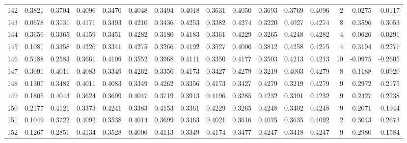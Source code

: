 \begin{tabular}{lrrrrrrrrrrrrrrr}
142 &      0.3821 &  0.3704 &  0.4096 &  0.3470 &  0.4048 &  0.3494 &  0.4018 &  0.3631 &  0.4050 &  0.3693 &   0.3769 &     0.4096 &      2 &                    0.0275 &                    -0.0117 \\
143 &      0.0678 &  0.3731 &  0.4171 &  0.3493 &  0.4210 &  0.3436 &  0.4253 &  0.3382 &  0.4274 &  0.3220 &   0.4027 &     0.4274 &      8 &                    0.3596 &                     0.3053 \\
144 &      0.3656 &  0.3365 &  0.4159 &  0.3451 &  0.4282 &  0.3180 &  0.4183 &  0.3361 &  0.4229 &  0.3265 &   0.4248 &     0.4282 &      4 &                    0.0626 &                    -0.0291 \\
145 &      0.1081 &  0.3358 &  0.4226 &  0.3341 &  0.4275 &  0.3266 &  0.4192 &  0.3527 &  0.4006 &  0.3812 &   0.4258 &     0.4275 &      4 &                    0.3194 &                     0.2277 \\
146 &      0.5188 &  0.2583 &  0.3661 &  0.4109 &  0.3552 &  0.3968 &  0.4111 &  0.3350 &  0.4177 &  0.3503 &   0.4213 &     0.4213 &     10 &                   -0.0975 &                    -0.2605 \\
147 &      0.3091 &  0.4011 &  0.4083 &  0.3349 &  0.4262 &  0.3356 &  0.4173 &  0.3427 &  0.4279 &  0.3219 &   0.4003 &     0.4279 &      8 &                    0.1188 &                     0.0920 \\
148 &      0.1307 &  0.3482 &  0.4011 &  0.4083 &  0.3349 &  0.4262 &  0.3356 &  0.4173 &  0.3427 &  0.4279 &   0.3219 &     0.4279 &      9 &                    0.2972 &                     0.2175 \\
149 &      0.1805 &  0.4043 &  0.3624 &  0.3699 &  0.4047 &  0.3719 &  0.3913 &  0.4196 &  0.3285 &  0.4232 &   0.3391 &     0.4232 &      9 &                    0.2427 &                     0.2238 \\
150 &      0.2177 &  0.4121 &  0.3373 &  0.4241 &  0.3383 &  0.4153 &  0.3361 &  0.4229 &  0.3265 &  0.4248 &   0.3402 &     0.4248 &      9 &                    0.2071 &                     0.1944 \\
151 &      0.1049 &  0.3722 &  0.4092 &  0.3538 &  0.4014 &  0.3699 &  0.3463 &  0.4021 &  0.3616 &  0.4075 &   0.3635 &     0.4092 &      2 &                    0.3043 &                     0.2673 \\
152 &      0.1267 &  0.2851 &  0.4134 &  0.3528 &  0.4006 &  0.4113 &  0.3349 &  0.4174 &  0.3477 &  0.4247 &   0.3418 &     0.4247 &      9 &                    0.2980 &                     0.1584 \\

\end{tabular}
